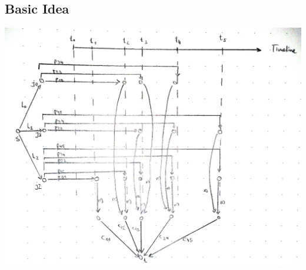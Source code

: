 \documentclass[12pt]{article}
\begin{document}
\subsection*{Basic Idea}
\includegraphics[width=\textwidth]{1.pdf}
\end{document}
